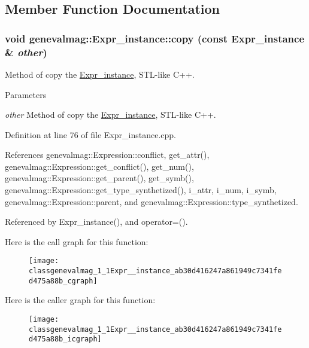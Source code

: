 \subsection{Member Function Documentation}
\hypertarget{classgenevalmag_1_1Expr__instance_ab30d416247a861949c7341fed475a88b}{
\subsubsection[{copy}]{\setlength{\rightskip}{0pt plus 5cm}void genevalmag::Expr\_\-instance::copy (const {\bf Expr\_\-instance} \& {\em other})}}
\label{classgenevalmag_1_1Expr__instance_ab30d416247a861949c7341fed475a88b}
Method of copy the \hyperlink{classgenevalmag_1_1Expr__instance}{Expr\_\-instance}, STL-\/like C++. 
\begin{DoxyParams}{Parameters}
\item[{\em other}]Method of copy the \hyperlink{classgenevalmag_1_1Expr__instance}{Expr\_\-instance}, STL-\/like C++. \end{DoxyParams}


Definition at line 76 of file Expr\_\-instance.cpp.



References genevalmag::Expression::conflict, get\_\-attr(), genevalmag::Expression::get\_\-conflict(), get\_\-num(), genevalmag::Expression::get\_\-parent(), get\_\-symb(), genevalmag::Expression::get\_\-type\_\-synthetized(), i\_\-attr, i\_\-num, i\_\-symb, genevalmag::Expression::parent, and genevalmag::Expression::type\_\-synthetized.



Referenced by Expr\_\-instance(), and operator=().



Here is the call graph for this function:\nopagebreak
\begin{figure}[H]
\begin{center}
\leavevmode
\texttt{[image: classgenevalmag\_1\_1Expr\_\_instance\_ab30d416247a861949c7341fed475a88b\_cgraph]}
\end{center}
\end{figure}




Here is the caller graph for this function:\nopagebreak
\begin{figure}[H]
\begin{center}
\leavevmode
\texttt{[image: classgenevalmag\_1\_1Expr\_\_instance\_ab30d416247a861949c7341fed475a88b\_icgraph]}
\end{center}
\end{figure}


